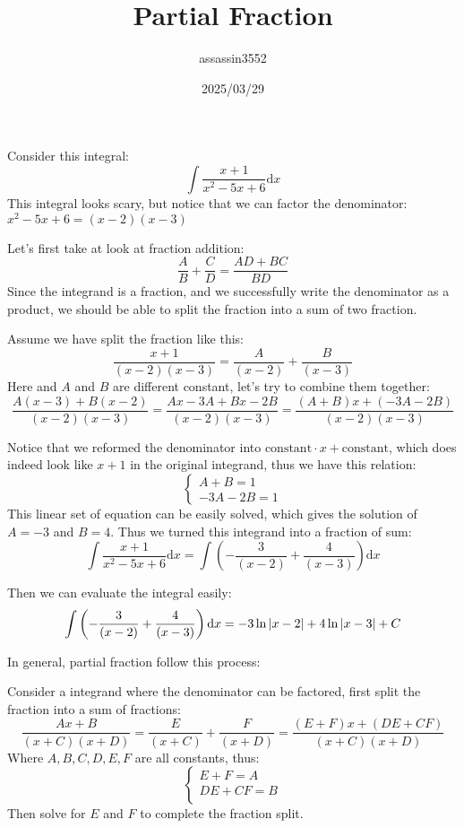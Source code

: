 \documentclass{article}
\title{Partial Fraction}
\author{assassin3552}
\date{2025/03/29}
\numberwithin{equation}{section}
\begin{document}
\maketitle

Consider this integral:
\[
\int \frac{x + 1}{x^2 -5x + 6} \mathrm{d}x
\]
This integral looks scary, but notice that we can factor the denominator:
$x^2 - 5x + 6 = (x-2)(x-3)$

Let's first take at look at fraction addition:
\[
\frac{A}{B} + \frac{C}{D} = \frac{AD + BC}{BD}
\]
Since the integrand is a fraction, and we successfully write the denominator as a product,
we should be able to split the fraction into a sum of two fraction.

Assume we have split the fraction like this:
\[
\frac{x + 1}{(x - 2)(x - 3)} = \frac{A}{(x - 2)} + \frac{B}{(x - 3)}
\]
Here and $A$ and $B$ are different constant, let's try to combine them together:
\[
\frac{A(x - 3) +B(x - 2)}{(x - 2)(x - 3)} = \frac{Ax - 3A + Bx - 2B}{(x-2)(x-3)} = \frac{(A+B)x + (-3A-2B)}{(x-2)(x-3)}
\]

Notice that we reformed the denominator into $\text{constant} \cdot x + \text{constant}$, which does indeed look like $x+1$ in the original integrand,
thus we have this relation:
\[
\begin{cases}
    A+B = 1\\
    -3A - 2B = 1
\end{cases}
\]
This linear set of equation can be easily solved, which gives the solution of $A = -3$ and $B = 4$. Thus we turned this integrand into a fraction of sum:
\[
\int \frac{x + 1}{x^2 - 5x + 6} \mathrm{d}x= \int \left(-\frac{3}{(x - 2)} + \frac{4}{(x - 3)} \right) \mathrm{d}x
\]

Then we can evaluate the integral easily:
\[
\int \left(-\frac{3}{(x - 2)} + \frac{4}{(x - 3)} \right) \mathrm{d}x = -3\ln\abs{x-2} + 4\ln\abs{x-3} + C
\]

\newpage
In general, partial fraction follow this process:

Consider a integrand where the denominator can be factored, first split the fraction into a sum of fractions:
\[
\frac{Ax + B}{(x + C)(x + D)} = \frac{E}{(x + C)} + \frac{F}{(x + D)} = \frac{(E + F)x + (DE + CF)}{(x + C)(x + D)}
\]
Where $A, B, C, D, E, F$ are all constants, thus:
\[
\begin{cases}
    E + F = A\\
    DE + CF = B\\
\end{cases}
\]
Then solve for $E$ and $F$ to complete the fraction split.
\end{document}
